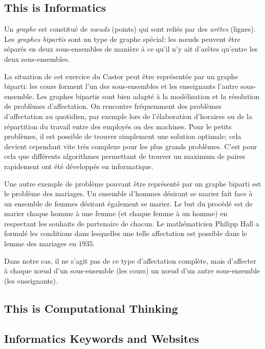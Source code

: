 \documentclass[a4paper,11pt]{report}
\newcommand{\taskGraphicsFolder}{..}
\begin{document}
\subsection*{This is Informatics}

Un \emph{graphe} est constitué de \emph{nœuds} (points) qui sont reliés par des \emph{arêtes} (lignes). Les \emph{graphes bipartis} sont un type de graphe spécial: les nœuds peuvent être séparés en deux sous-ensembles de manière à ce qu’il n’y ait d’arêtes qu’entre les deux sous-ensembles.

{\centering%
\par}

La situation de cet exercice du Castor peut être représentée par un graphe biparti: les cours forment l’un des sous-ensembles et les enseignants l’autre sous-ensemble. Les graphes bipartis sont bien adapté à la modélisation et la résolution de problèmes d’affectation. On rencontre fréquemment des problèmes d’affectation au quotidien, par exemple lors de l’élaboration d’horaires ou de la répartition du travail entre des employés ou des machines. Pour le petits problèmes, il est possible de trouver simplement une solution optimale; cela devient cependant vite très complexe pour les plus grands problèmes. C’est pour cela que différents algorithmes permettant de trouver un maximum de paires rapidement ont été développés en informatique.

Une autre exemple de problème pouvant être représenté par un graphe biparti est le problème des mariages. Un ensemble d’hommes désirant se marier fait face à un ensemble de femmes désirant également se marier. Le but du procédé est de marier chaque homme à une femme (et chaque femme à un homme) en respectant les souhaits de partenaire de chacun. Le mathématicien Philipp Hall a formulé les conditions dans lesquelles une telle affectation est possible dans le lemme des mariages en $1935$.

Dans notre cas, il ne s’agit pas de ce type d’affectation complète, mais d’affecter à chaque nœud d’un sous-ensemble (les cours) un nœud d’un autre sous-ensemble (les enseignants).


\subsection*{This is Computational Thinking}


\subsection*{Informatics Keywords and Websites}
\end{document}
